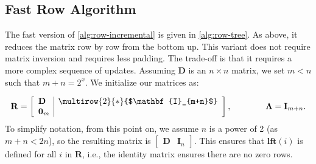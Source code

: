 \documentclass{article}
\newcommand{\matsize}[2]{#1\times #2}
\newcommand{\mat}[1]{\mathbf{#1}}
\newcommand{\bdr}{\mat{D}}
\newcommand{\lft}{\mathbf{lft}}
\newcommand{\Remark}[1]{\textcolor{blue}{[#1]}}
\begin{document}
\subsection{Fast Row Algorithm}
The fast version of \cref{alg:row-incremental} is given in \cref{alg:row-tree}.
As above, it reduces the matrix row by row from the bottom up. This variant does not require matrix inversion and requires less padding. The trade-off is that it requires a more complex sequence of updates. Assuming $\mat{D}$ is an $\matsize{n}{n}$ matrix,  we set $m<n$ such that $m+n = 2^x$. We  initialize our matrices as:


\[
\mat{R} = 
\left[
\begin{array}{l|c}
\bdr & \multirow{2}{*}{$\mat{I}_{m+n}$}\\
\mat{0}_m& 
\end{array}
\right], \qquad\qquad \mat{\Lambda} = \mat{I}_{m+n}. 
\]
%
%
To simplify notation, from this point on, we assume $n$ is a power of 2 (as $m+n<2n$), so the resulting matrix is $\begin{bmatrix} \mat{D}& \mat{I}_n\end{bmatrix}$. This ensures that $\lft  (i)$ is defined for all $i$ in $\mat{R}$, i.e., the identity matrix ensures there are no zero rows.  
\end{document}
